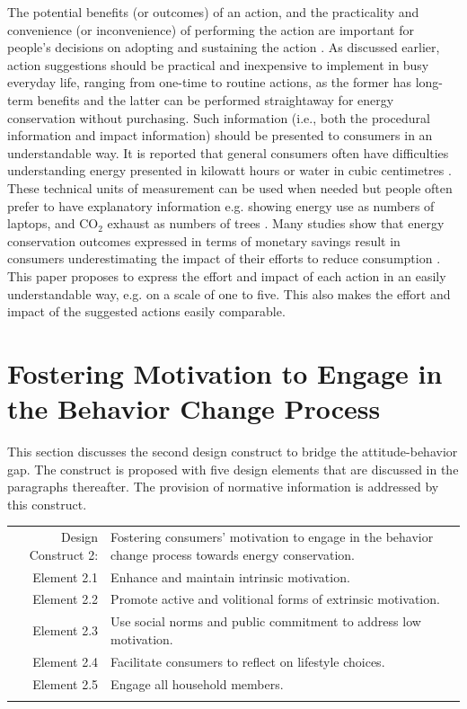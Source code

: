 \documentclass[a4paper,10pt]{article}
\begin{document}
The potential benefits (or outcomes) of an action, and the practicality and convenience (or inconvenience) of performing the action are important for people's decisions on adopting and sustaining the action \citep{Schultz2002,Claudy2013}. As discussed earlier, action suggestions should be practical and inexpensive to implement in busy everyday life, ranging from one-time to routine actions, as the former has long-term benefits and the latter can be performed straightaway for energy conservation without purchasing. Such information (i.e., both the procedural information and impact information) should be presented to consumers in an understandable way. It is reported that general consumers often have difficulties understanding energy presented in kilowatt hours or water in cubic centimetres \citep{Froehlich2009,+}. These technical units of measurement can be used when needed but people often prefer to have explanatory information e.g. showing energy use as numbers of laptops, and CO$_{2}$ exhaust as numbers of trees \citep{Petkov2011}. Many studies show that energy conservation outcomes expressed in terms of monetary savings result in consumers underestimating the impact of their efforts to reduce consumption \citep{Froehlich2009,Pierce2010,Abrahamse2013}. This paper proposes to express the effort and impact of each action in an easily understandable way, e.g. on a scale of one to five. This also makes the effort and impact of the suggested actions easily comparable. 


\section{Fostering Motivation to Engage in the Behavior Change Process}
\label{sec:motivation}

This section discusses the second design construct to bridge the attitude-behavior gap. The construct is proposed with five design elements that are discussed in the paragraphs thereafter. The provision of normative information is addressed by this construct.

\begin{table}[h!]
\def\arraystretch{1.5}
\begin{tabularx}{\textwidth}{!{\color{gray!40}\vrule} r X !{\color{gray!40}\vrule}}
\hline
{} Design Construct 2:  &  Fostering consumers' motivation to engage in the behavior change process towards energy conservation.\\
Element 2.1 & Enhance and maintain intrinsic motivation. \\
Element 2.2 & Promote active and volitional forms of extrinsic motivation. \\
Element 2.3 & Use social norms and public commitment to address low motivation.\\
Element 2.4 & Facilitate consumers to reflect on lifestyle choices.\\
Element 2.5 & Engage all household members. \\ \hline
\end{tabularx}
\end{table}
\end{document}
